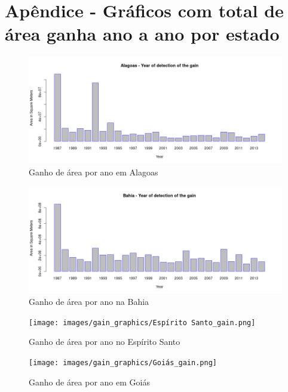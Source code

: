 \section{Apêndice - Gráficos com total de área ganha ano a ano por estado}

\begin{figure}[H]
    \centering
    \includegraphics[scale=.5]{images/gain_graphics/Alagoas_gain.png}
    \caption{Ganho de área por ano em Alagoas}
    \label{fig:gain_alagoas}
\end{figure}

\begin{figure}[H]
    \centering
    \includegraphics[scale=.5]{images/gain_graphics/Bahia_gain.png}
    \caption{Ganho de área por ano na Bahia}
    \label{fig:gain_bahia}
\end{figure}

\begin{figure}[H]
    \centering
    \texttt{[image: images/gain\_graphics/Espírito Santo\_gain.png]}
    \caption{Ganho de área por ano no Espírito Santo}
    \label{fig:gain_espirito_santo}
\end{figure}

\begin{figure}[H]
    \centering
    \texttt{[image: images/gain\_graphics/Goiás\_gain.png]}
    \caption{Ganho de área por ano em Goiás}
    \label{fig:gain_goias}
\end{figure}

